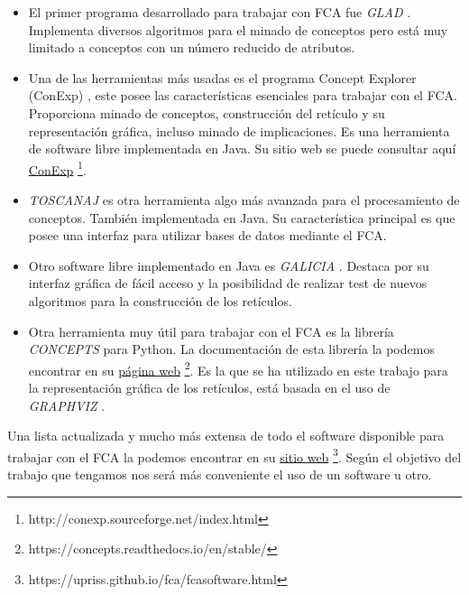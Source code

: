 \documentclass[oneside,openright,titlepage,numbers=noenddot,openany,headinclude,footinclude=true,
cleardoublepage=empty,abstractoff,BCOR=5mm,paper=a4,fontsize=12pt,main=spanish]{scrreprt}
\begin{document}
\begin{itemize}

    \item El primer programa desarrollado para trabajar con FCA fue \textit{GLAD} \cite{glad}.  Implementa diversos algoritmos para el minado de conceptos pero está muy limitado a conceptos con un número reducido de atributos.
    
    \item Una de las herramientas más usadas es el programa Concept Explorer (ConExp) \cite{concept-explorersoftware}, este posee las características esenciales para trabajar con el FCA. Proporciona minado de conceptos, construcción del retículo y su representación gráfica, incluso minado de implicaciones. Es una herramienta de software libre implementada en Java. Su sitio web se puede consultar aquí \href{http://conexp.sourceforge.net/index.html}{ConExp} \footnote{http://conexp.sourceforge.net/index.html}.
    
    \item \textit{TOSCANAJ} \cite{toscana} es otra herramienta algo más avanzada para el procesamiento de conceptos. También implementada en Java. Su característica principal es que posee una interfaz para utilizar bases de datos mediante el FCA.
    
    \item Otro software libre implementado en Java es \textit{GALICIA} \cite{galicia}. Destaca por su interfaz gráfica de fácil acceso y la posibilidad de realizar test de nuevos algoritmos para la construcción de los retículos.
    
    
    \item Otra herramienta muy útil para trabajar con el FCA es la librería \textit{CONCEPTS} para Python. La documentación de esta librería la podemos encontrar en su \href{https://concepts.readthedocs.io/en/stable/}{ página web} \footnote{https://concepts.readthedocs.io/en/stable/}. Es la que se ha utilizado en este trabajo para la representación gráfica de los retículos, está basada en el uso de \textit{GRAPHVIZ} \cite{graphviz}.
    
\end{itemize}

Una lista actualizada y mucho más extensa de todo el software disponible para trabajar con el FCA la podemos encontrar en su \href{https://upriss.github.io/fca/fcasoftware.html}{sitio web} \footnote{https://upriss.github.io/fca/fcasoftware.html}. Según el objetivo del trabajo que tengamos nos será más conveniente el uso de un software u otro.
\end{document}
